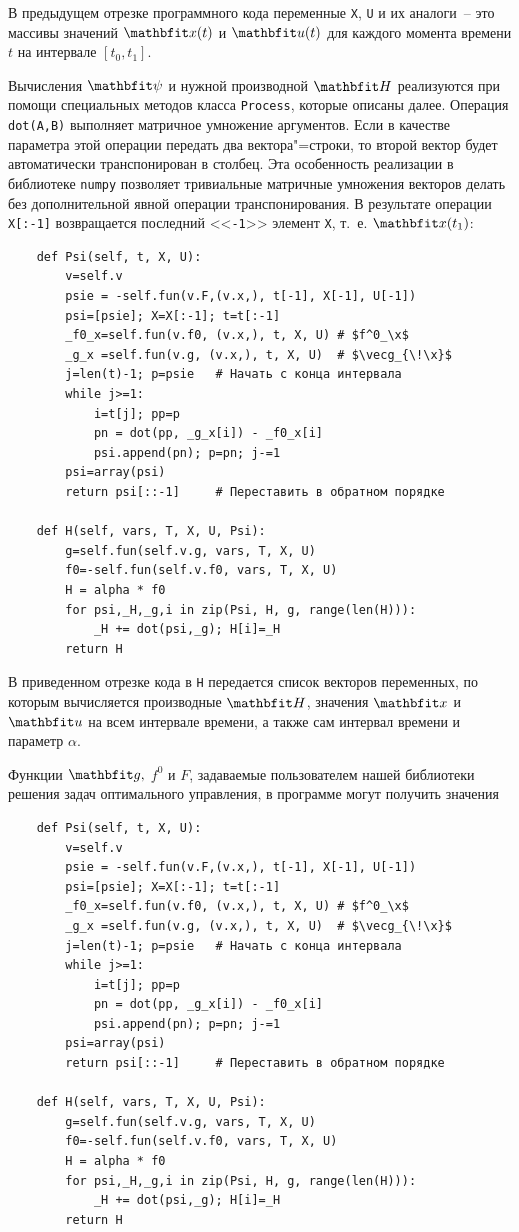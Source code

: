 \documentclass[a4paper,14pt, openany, twoside, final]{extbook} %
\begin{document}
В предыдущем отрезке программного кода переменные \texttt{X}, \texttt{U} и их аналоги~-- это массивы значений $\vecx(t)$ и $\vecu(t)$ для каждого момента времени $t$ на интервале $[t_0,t_1]$.

Вычисления $\vecpsi$ и нужной производной $\vecH$ реализуются при помощи специальных методов класса \texttt{Process}, которые описаны далее.  Операция \texttt{dot(A,B)} выполняет матричное умножение аргументов.  Если в качестве параметра этой операции передать два вектора"=строки, то второй вектор будет автоматически транспонирован в столбец.  Эта особенность реализации в библиотеке \texttt{numpy} позволяет тривиальные матричные умножения векторов делать без дополнительной явной операции транспонирования.  В результате операции \texttt{X[:-1]} возвращается последний <<\texttt{-1}>> элемент \texttt{X}, т.~е. $\x(t_1)$:

\begin{verbatim}
    def Psi(self, t, X, U):
        v=self.v
        psie = -self.fun(v.F,(v.x,), t[-1], X[-1], U[-1])
        psi=[psie]; X=X[:-1]; t=t[:-1]
        _f0_x=self.fun(v.f0, (v.x,), t, X, U) # $f^0_\x$
        _g_x =self.fun(v.g, (v.x,), t, X, U)  # $\vecg_{\!\x}$
        j=len(t)-1; p=psie   # Начать с конца интервала
        while j>=1:
            i=t[j]; pp=p
            pn = dot(pp, _g_x[i]) - _f0_x[i]
            psi.append(pn); p=pn; j-=1
        psi=array(psi)
        return psi[::-1]     # Переставить в обратном порядке

    def H(self, vars, T, X, U, Psi):
        g=self.fun(self.v.g, vars, T, X, U)
        f0=-self.fun(self.v.f0, vars, T, X, U)
        H = alpha * f0
        for psi,_H,_g,i in zip(Psi, H, g, range(len(H))):
            _H += dot(psi,_g); H[i]=_H
        return H
\end{verbatim}

В приведенном отрезке кода в \texttt{H} передается список векторов переменных, по которым вычисляется производные $\vecH$, значения $\vecx$ и $\vecu$ на всем интервале времени, а также сам интервал времени и параметр $\alpha$.

Функции $\vecg,$ $f^0$ и $F$, задаваемые пользователем нашей библиотеки решения задач оптимального управления, в программе могут получить значения

\begin{verbatim}
    def Psi(self, t, X, U):
        v=self.v
        psie = -self.fun(v.F,(v.x,), t[-1], X[-1], U[-1])
        psi=[psie]; X=X[:-1]; t=t[:-1]
        _f0_x=self.fun(v.f0, (v.x,), t, X, U) # $f^0_\x$
        _g_x =self.fun(v.g, (v.x,), t, X, U)  # $\vecg_{\!\x}$
        j=len(t)-1; p=psie   # Начать с конца интервала
        while j>=1:
            i=t[j]; pp=p
            pn = dot(pp, _g_x[i]) - _f0_x[i]
            psi.append(pn); p=pn; j-=1
        psi=array(psi)
        return psi[::-1]     # Переставить в обратном порядке

    def H(self, vars, T, X, U, Psi):
        g=self.fun(self.v.g, vars, T, X, U)
        f0=-self.fun(self.v.f0, vars, T, X, U)
        H = alpha * f0
        for psi,_H,_g,i in zip(Psi, H, g, range(len(H))):
            _H += dot(psi,_g); H[i]=_H
        return H
\end{verbatim}
\end{document}

